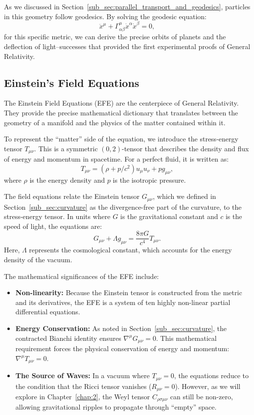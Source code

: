As we discussed in Section~\ref{sub_sec:parallel_transport_and_geodesics}, particles in this geometry follow geodesics. By solving the geodesic equation:
\[%
  \ddot{x}^\mu + \Gamma_{\alpha\beta}^\mu \dot{x}^\alpha \dot{x}^\beta = 0
,\]%
for this specific metric, we can derive the precise orbits of planets and the deflection of light--successes that provided the first experimental proofs of General Relativity.

\subsection{Einstein's Field Equations} The Einstein Field Equations (EFE) are the centerpiece of General Relativity. They provide the precise mathematical dictionary that translates between the geometry of a manifold and the physics of the matter contained within it.

To represent the ``matter'' side of the equation, we introduce the stress-energy tensor $T_{\mu\nu}$. This is a symmetric $(0,2)$-tensor that describes the density and flux of energy and momentum in spacetime. For a perfect fluid, it is written as:
\[%
  T_{\mu\nu} = (\rho + p/c^2)u_\mu u_\nu + pg_{\mu\nu}
,\]%
where $\rho$ is the energy density and $p$ is the isotropic pressure.

The field equations relate the Einstein tensor $G_{\mu\nu}$, which we defined in Section~\ref{sub_sec:curvature} as the divergence-free part of the curvature, to the stress-energy tensor. In units where $G$ is the gravitational constant and $c$ is the speed of light, the equations are:
\[%
  G_{\mu\nu} + \Lambda g_{\mu\nu} = \frac{8\pi G}{c^4} T_{\mu\nu}
.\]%
Here, $\Lambda$ represents the cosmological constant, which accounts for the energy density of the vacuum.

The mathematical significances of the EFE include:
\begin{itemize}
  \item \textbf{Non-linearity:} Because the Einstein tensor is constructed from the metric and its derivatives, the EFE is a system of ten highly non-linear partial differential equations.
  \item \textbf{Energy Conservation:} As noted in Section~\ref{sub_sec:curvature}, the contracted Bianchi identity ensures $\nabla^\mu G_{\mu\nu} = 0$. This mathematical requirement forces the physical conservation of energy and momentum: $\nabla^\mu T_{\mu\nu} = 0$.
  \item \textbf{The Source of Waves:} In a vacuum where $T_{\mu\nu} = 0$, the equations reduce to the condition that the Ricci tensor vanishes ($R_{\mu\nu} = 0$). However, as we will explore in Chapter~\ref{chap:2}, the Weyl tensor $C_{\rho\sigma\mu\nu}$ can still be non-zero, allowing gravitational ripples to propagate through ``empty'' space.
\end{itemize}
